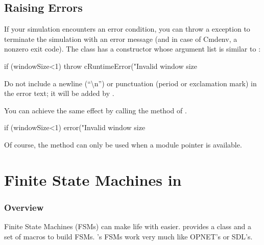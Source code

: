 \subsection{Raising Errors}

If your simulation encounters an error condition, you can throw a
 exception to terminate the simulation with
an error message (and in case of Cmdenv, a nonzero exit code).
The  class has a constructor whose argument list
is similar to :

\begin{cpp}
if (windowSize<1)
    throw cRuntimeError("Invalid window size %
\end{cpp}

Do not include a newline (``{\textbackslash}n'') or punctuation (period
or exclamation mark) in the error text; it will be added by {\opp}.

You can achieve the same effect by calling the  method of
.

\begin{cpp}
if (windowSize<1)
    error("Invalid window size %
\end{cpp}

Of course, the  method can only be used when a module pointer
is available.



\section{Finite State Machines in {\opp}}
\label{sec:simple-modules:fsm}

\subsubsection{Overview}


Finite State Machines (FSMs)
can make life with  easier. {\opp} provides a
class and a set of macros to build FSMs. {\opp}'s FSMs work very much
like OPNET's or SDL's.


